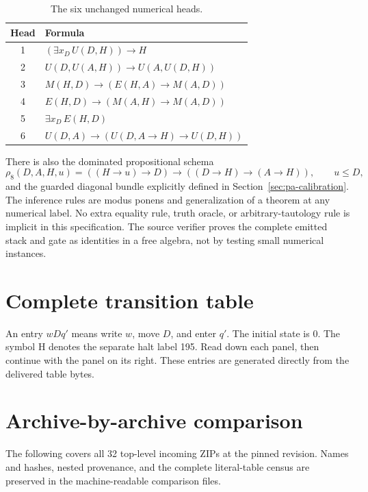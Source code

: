 \documentclass[11pt,letterpaper]{article}
\begin{document}
\begin{table}[ht]\centering\small
\begin{tabular}{@{}cl@{}}
\toprule Head&Formula\\\midrule
1&$(\exists x_D\,U(D,H))\to H$\\
2&$U(D,U(A,H))\to U(A,U(D,H))$\\
3&$M(H,D)\to(E(H,A)\to M(A,D))$\\
4&$E(H,D)\to(M(A,H)\to M(A,D))$\\
5&$\exists x_D\,E(H,D)$\\
6&$U(D,A)\to(U(D,A\to H)\to U(D,H))$\\
\bottomrule
\end{tabular}
\caption{The six unchanged numerical heads.}\label{tab:heads}
\end{table}

There is also the dominated propositional schema
\[
 \rho_8(D,A,H,u)=((H\to u)\to D)\to((D\to H)\to(A\to H)),
 \qquad u\le D,
\]
and the guarded diagonal bundle explicitly defined in
Section~\ref{sec:pa-calibration}. The inference rules are modus ponens and
generalization of a theorem at any numerical label. No extra equality rule,
truth oracle, or arbitrary-tautology rule is implicit in this specification.
The source verifier proves the complete emitted stack and gate as identities
in a free algebra, not by testing small numerical instances.






\appendix
\clearpage
\section{Complete transition table}\label{app:table}
An entry $wDq'$ means write $w$, move $D$, and enter $q'$. The initial state
is 0. The symbol $\mathrm H$ denotes the separate halt label 195. Read
down each panel, then continue with the panel on its right. These entries
are generated directly from the delivered table bytes.


\clearpage
\section{Archive-by-archive comparison}\label{app:archives}
The following covers all 32 top-level incoming ZIPs at the pinned revision.
Names and hashes, nested provenance, and the complete literal-table census
are preserved in the machine-readable comparison files.

\end{document}

